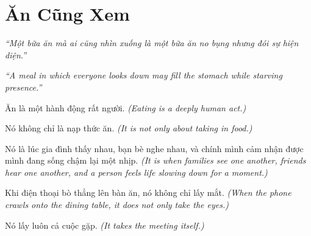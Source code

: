 \chapter{Ăn Cũng Xem}

\begin{center}
	\textit{\color{bookprimary}``Một bữa ăn mà ai cũng nhìn xuống là một bữa ăn no bụng nhưng đói sự hiện diện.''}

	\textit{\color{bookprimary}``A meal in which everyone looks down may fill the stomach while starving presence.''}
\end{center}

\ngancach

\begin{tcolorbox}[colback=bookprimary!6,colframe=bookprimary!35,arc=5pt,title={\bfseries Góc Suy Nghĩ},fonttitle=\bfseries\color{bookprimary}]
Ăn là một hành động rất người.
\textit{(Eating is a deeply human act.)}

Nó không chỉ là nạp thức ăn.
\textit{(It is not only about taking in food.)}

Nó là lúc gia đình thấy nhau, bạn bè nghe nhau, và chính mình cảm nhận được mình đang sống chậm lại một nhịp.
\textit{(It is when families see one another, friends hear one another, and a person feels life slowing down for a moment.)}

Khi điện thoại bò thẳng lên bàn ăn, nó không chỉ lấy mắt.
\textit{(When the phone crawls onto the dining table, it does not only take the eyes.)}

Nó lấy luôn cả cuộc gặp.
\textit{(It takes the meeting itself.)}
\end{tcolorbox}

